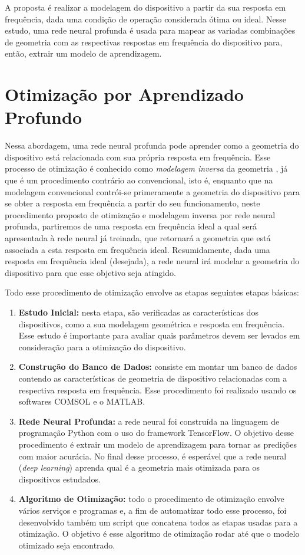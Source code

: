 A proposta é realizar a modelagem do dispositivo a partir da sua resposta em frequência, dada uma condição de operação considerada ótima ou ideal. Nesse estudo, uma rede neural profunda é usada para mapear as variadas combinações de geometria com as respectivas respostas em frequência do dispositivo para, então, extrair um modelo de aprendizagem.


\section{Otimização por Aprendizado Profundo}

Nessa abordagem, uma rede neural profunda pode aprender como a geometria do dispositivo está relacionada com sua própria resposta em frequência. Esse processo de otimização é conhecido como \textit{modelagem inversa} da geometria \cite{liu2018training,malkiel2017deep,peurifoy2018nanophotonic}, já que é um procedimento contrário ao convencional, isto é, enquanto que na modelagem convencional contrói-se primeramente a geometria do dispositivo para se obter a resposta em frequência a partir do seu funcionamento, neste procedimento proposto de otimização e modelagem inversa por rede neural profunda, partiremos de uma resposta em frequência ideal a qual será apresentada à rede neural já treinada, que retornará a geometria que está associada a esta resposta em frequência ideal. Resumidamente, dada uma resposta em frequência ideal (desejada), a rede neural irá modelar a geometria do dispositivo para que esse objetivo seja atingido.

Todo esse procedimento de otimização envolve as etapas seguintes etapas básicas:

\begin{enumerate}
	\item \textbf{Estudo Inicial:} nesta etapa, são verificadas as características dos dispositivos, como a sua modelagem geométrica e resposta em frequência. Esse estudo é importante para avaliar quais parâmetros devem ser levados em consideração para a otimização do dispositivo.
	\item \textbf{Construção do Banco de Dados:} consiste em montar um banco de dados contendo as características de geometria de dispositivo relacionadas com a respectiva resposta em frequência. Esse procedimento foi realizado usando os softwares COMSOL e o MATLAB.
	\item \textbf{Rede Neural Profunda:} a rede neural foi construída na linguagem de programação Python com o uso do framework TensorFlow. O objetivo desse procedimento é extrair um modelo de aprendizagem para tornar as predições com maior acurácia. No final desse processo, é esperável que a rede neural (\textit{deep learning}) aprenda qual é a geometria mais otimizada para os dispositivos estudados.
	\item \textbf{Algoritmo de Otimização:} todo o procedimento de otimização envolve vários serviços e programas e, a fim de automatizar todo esse processo, foi desenvolvido também um script que concatena todos as etapas usadas para a otimização. O objetivo é esse algoritmo de otimização rodar até que o modelo otimizado seja encontrado.
\end{enumerate}


